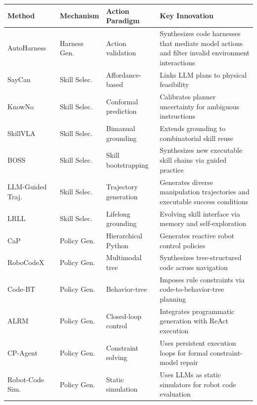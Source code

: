\documentclass{llmxive}
\providecommand{\arraystretch}{1.15}
\begin{document}
\begin{table}[t]
\centering
\renewcommand{\arraystretch}{1.15}
\setlength{\tabcolsep}{4pt}
\footnotesize
\begin{tabularx}{\textwidth}{p{2.7cm}p{1.7cm}p{3.0cm}X}
\toprule
\textbf{Method} & \textbf{Mechanism} & \textbf{Action Paradigm} & \textbf{Key Innovation} \\
\midrule
AutoHarness~\cite{lou2026autoharnessimprovingllmagents} & Harness Gen. & Action validation & Synthesizes code harnesses that mediate model actions and filter invalid environment interactions \\
SayCan~\cite{ahn2022can} & Skill Selec. & Affordance-based & Links LLM plans to physical feasibility \\
KnowNo~\cite{ren2023robots} & Skill Selec. & Conformal prediction & Calibrates planner uncertainty for ambiguous instructions \\
SkillVLA~\cite{zhai2026skillvla} & Skill Selec. & Bimanual grounding & Extends grounding to combinatorial skill reuse \\
BOSS~\cite{zhang2023bootstrap} & Skill Selec. & Skill bootstrapping & Synthesizes new executable skill chains via guided practice \\
LLM-Guided Traj.~\cite{ha2023scaling} & Skill Selec. & Trajectory generation & Generates diverse manipulation trajectories and executable success conditions \\
LRLL~\cite{tziafas2024lifelong} & Skill Selec. & Lifelong grounding & Evolving skill interface via memory and self-exploration \\
CaP~\cite{liang2023code} & Policy Gen. & Hierarchical Python & Generates reactive robot control policies \\
RoboCodeX~\cite{mu2024robocodex} & Policy Gen. & Multimodal tree & Synthesizes tree-structured code across navigation \\
Code-BT~\cite{zhang2025codebt} & Policy Gen. & Behavior-tree & Imposes rule constraints via code-to-behavior-tree planning \\
ALRM~\cite{santos2026alrm} & Policy Gen. & Closed-loop control & Integrates programmatic generation with ReAct execution \\
CP-Agent~\cite{szeider2025cp} & Policy Gen. & Constraint solving & Uses persistent execution loops for formal constraint-model repair \\
Robot-Code Sim.~\cite{wang2025llm} & Policy Gen. & Static simulation & Uses LLMs as static simulators for robot code evaluation \\

\end{tabularx}
\end{table}
\end{document}
